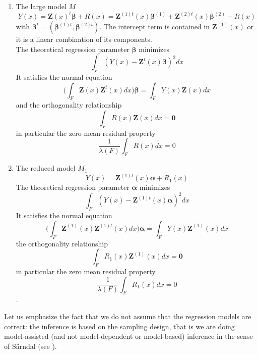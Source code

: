 \documentclass[a4paper,12pt,leqno, titlepage]{article}
\begin{document}
 \begin{enumerate}
 \item
 The large model $M$
 $$ Y(x)=\pmb{Z}(x)^t\pmb{\beta}+ R(x)=\pmb{Z}^{(1)t}(x)\pmb{\beta}^{(1)}
 +\pmb{Z}^{(2)t}(x)\pmb{\beta}^{(2)}+ R(x)$$
 \noindent with $\pmb{\beta}^t=({\pmb{\beta}^{(1)t}}, {\pmb{\beta}^{(2)t}})$.
 The intercept term is contained in $\pmb{Z}^{(1)}(x)$ or it is a linear combination of its components.\\
 The theoretical regression parameter $\pmb{\beta}$ minimizes
 $$\int_F (Y(x)-\pmb{Z}^t(x)\pmb{\beta})^2dx$$
 It satisfies the normal equation
 $$\big(\int_F\pmb{Z}(x)\pmb{Z}^t(x)dx\big)\pmb{\beta}=\int_F Y(x)\pmb{Z}(x)dx$$ and the orthogonality relationship
 $$\int_F R(x)\pmb{Z}(x)dx=\pmb{0}$$
 \noindent in particular the zero mean residual property
 $$\frac{1}{\lambda(F)}\int_F R(x)dx=0$$
 \item
 The reduced model $M_1$
 $$ Y(x)=\pmb{Z}^{(1)t}(x)\pmb{\alpha} + R_1(x)$$
 The theoretical regression parameter $\pmb{\alpha}$ minimizes
 $$\int_F (Y(x)-\pmb{Z}^{(1)t}(x)\pmb{\alpha})^2dx$$
 It satisfies the normal equation
 $$\big(\int_F \pmb{Z}^{(1)}(x)\pmb{Z}^{(1)t}(x)dx\big)\pmb{\alpha}=\int_FY(x)\pmb{Z}^{(1)}(x)dx$$ the orthogonality relationship
 $$\int_F R_1(x)\pmb{Z}^{(1)}(x)dx=\pmb{0}$$
 \noindent in particular the zero mean residual property
 $$ \frac{1}{\lambda(F)}\int_F R_1(x)dx=0$$.
\end{enumerate}
Let us emphasize the fact that we do not assume that the regression models are correct: the inference is based on the sampling design, that is we are doing model-assisted (and not model-dependent or model-based) inference in the sense of S\"{a}rndal (see \cite{sarndal}).
\end{document}
